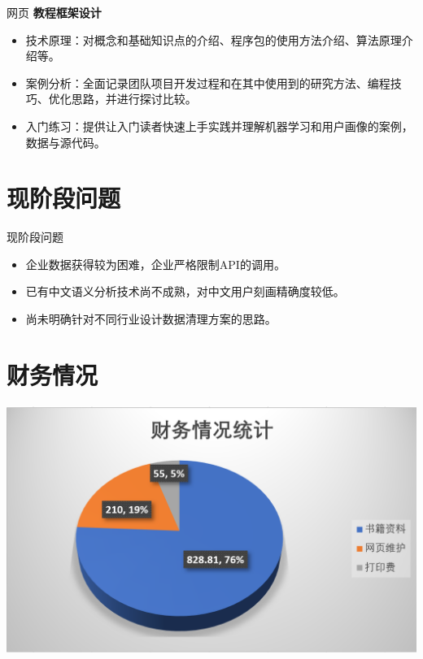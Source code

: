 \documentclass[10pt]{beamer}
\begin{document}
\begin{frame}{网页}
\textbf{教程框架设计}
\begin{itemize}
\item 技术原理：对概念和基础知识点的介绍、程序包的使用方法介绍、算法原理介绍等。\newline
\item 案例分析：全面记录团队项目开发过程和在其中使用到的研究方法、编程技巧、优化思路，并进行探讨比较。\newline
\item 入门练习：提供让入门读者快速上手实践并理解机器学习和用户画像的案例，数据与源代码。\newline
\end{itemize}
\end{frame}

\section{现阶段问题}
  \begin{frame}{现阶段问题}
    \begin{itemize}
      \item 企业数据获得较为困难，企业严格限制API的调用。\newline
      \item 已有中文语义分析技术尚不成熟，对中文用户刻画精确度较低。\newline
      \item 尚未明确针对不同行业设计数据清理方案的思路。
    \end{itemize}
  \end{frame}


\section{财务情况}
  \begin{frame}{}
  \includegraphics[height=0.66\paperheight]{finance}
  \end{frame}
\end{document}
